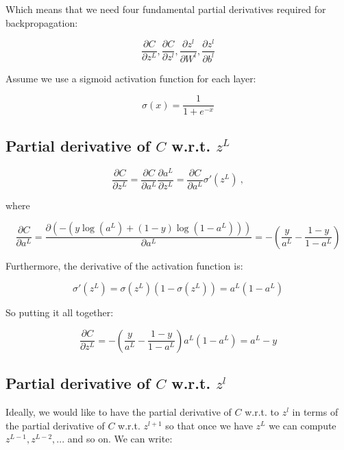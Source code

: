 \documentclass{article}
\begin{document}
Which means that we need four fundamental partial derivatives required for backpropagation:

\begin{equation}
\frac{\partial C}{\partial z^L}, \frac{\partial C}{\partial z^l}, \frac{\partial z^l}{\partial W^l}, \frac{\partial z^l}{\partial b^l}
\end{equation}

Assume we use a sigmoid activation function for each layer:

\begin{equation}
\sigma(x) = \frac{1}{1 + e^{-x}}
\end{equation}

\subsection{Partial derivative of $C$ w.r.t. $z^L$}

\begin{equation}
\frac{\partial C}{\partial z^L} = \frac{\partial C}{\partial a^L}\frac{\partial a^L}{\partial z^L} = \frac{\partial C}{\partial a^L} \sigma'(z^L)~,
\end{equation}

where

\begin{equation}
\frac{\partial C}{\partial a^L} = \frac{\partial (-(y\log(a^L) + (1-y)\log(1 - a^L)))}{\partial a^L} = -(\frac{y}{a^L} - \frac{1 - y}{1 - a^L})
\end{equation}

Furthermore, the derivative of the activation function is:

\begin{equation}
\sigma'(z^L) = \sigma(z^L)(1 - \sigma(z^L)) = a^L (1-a^L)
\end{equation}

So putting it all together:

\begin{equation}
\frac{\partial C}{\partial z^L} = -(\frac{y}{a^L} - \frac{1 - y}{1 - a^L})a^L (1-a^L) = a^L - y
\end{equation}

\subsection{Partial derivative of $C$ w.r.t. $z^l$}

Ideally, we would like to have the partial derivative of $C$ w.r.t. to $z^l$ in terms of the partial derivative of $C$ w.r.t. $z^{l+1}$ so that once we have $z^L$ we can compute $z^{L-1}, z^{L-2}, ...$ and so on. We can write:
\end{document}
